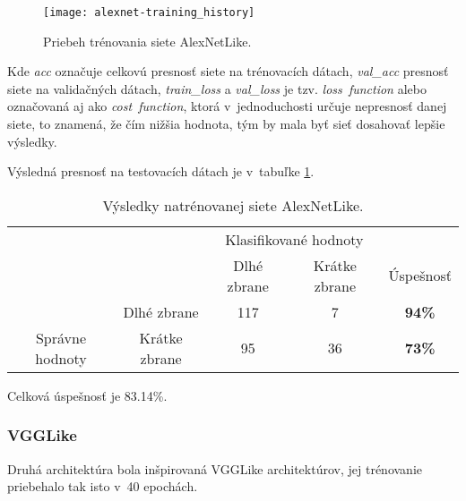 \begin{figure}[H]
	\centering
	\texttt{[image: alexnet-training\_history]}
	\caption{Priebeh trénovania siete AlexNetLike.}
	\label{pic:alexnetlikehistory}
\end{figure}
Kde \textit{acc} označuje celkovú presnosť siete na trénovacích dátach, \textit{val\_acc} presnosť siete na validačných dátach, \textit{train\_loss} a
    \textit{val\_loss} je tzv. \textit{loss\ function} alebo označovaná aj ako \textit{cost\ function}, ktorá v~jednoduchosti určuje nepresnosť danej siete,
    to znamená, že čím nižšia hodnota, tým by mala byť sieť dosahovať lepšie výsledky.

    Výsledná presnosť na testovacích dátach je v~tabuľke \ref{tab:alexnetresults}.

\begin{table}[H]
    \centering
    \begin{tabular}{ccccc}
                                                                &                                    & \multicolumn{2}{c}{Klasifikované hodnoty}                                                         &                                    \\ \cline{3-5} 
                                                                & \multicolumn{1}{c|}{}              & \multicolumn{1}{c|}{Dlhé zbrane}                & \multicolumn{1}{c|}{Krátke zbrane}              & \multicolumn{1}{c|}{Úspešnosť}     \\ \cline{2-5} 
        \multicolumn{1}{c|}{}                                  & \multicolumn{1}{c|}{Dlhé zbrane}   & \multicolumn{1}{c|}{{\color[HTML]{009901} 117}} & \multicolumn{1}{c|}{{\color[HTML]{9A0000} 7}}  & \multicolumn{1}{c|}{\textbf{94\%}} \\ \cline{2-5} 
        \multicolumn{1}{c|}{\multirow{-2}{*}{Správne hodnoty}} & \multicolumn{1}{c|}{Krátke zbrane} & \multicolumn{1}{c|}{{\color[HTML]{9A0000} 95}}  & \multicolumn{1}{c|}{{\color[HTML]{009901} 36}} & \multicolumn{1}{c|}{\textbf{73\%}} \\ \cline{2-5} 
    \end{tabular}
    \caption{Výsledky natrénovanej siete AlexNetLike.}
    \label{tab:alexnetresults}
\end{table}
Celková úspešnosť je 83.14\%.

\subsubsection{VGGLike}
Druhá architektúra bola inšpirovaná VGGLike architektúrov, jej trénovanie priebehalo tak isto v~40 epochách.

